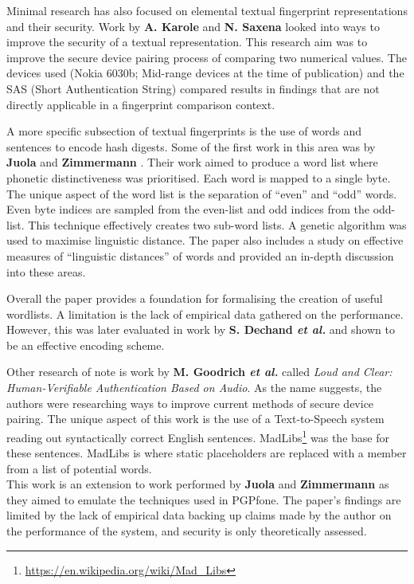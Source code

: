 Minimal research has also focused on elemental textual fingerprint representations and their security. Work by \textbf{A. Karole} and \textbf{N. Saxena}\cite{karole2009improving} looked into ways to improve the security of a textual representation. This research aim was to improve the secure device pairing process of comparing two numerical values. The devices used (Nokia 6030b; Mid-range devices at the time of publication) and the SAS (Short Authentication String) compared results in findings that are not directly applicable in a fingerprint comparison context. 

A more specific subsection of textual fingerprints is the use of words and sentences to encode hash digests. Some of the first work in this area was by \textbf{Juola} and \textbf{Zimmermann} \cite{juola1996whole}. Their work aimed to produce a word list where phonetic distinctiveness was prioritised. Each word is mapped to a single byte. The unique aspect of the word list is the separation of ``even'' and ``odd'' words. Even byte indices are sampled from the even-list and odd indices from the odd-list. This technique effectively creates two sub-word lists.  A genetic algorithm was used to maximise linguistic distance. The paper also includes a study on effective measures of ``linguistic distances'' of words and provided an in-depth discussion into these areas.

Overall the paper provides a foundation for formalising the creation of useful wordlists. A limitation is the lack of empirical data gathered on the performance. However, this was later evaluated in work by \textbf{S. Dechand \textit{et al.}}\cite{dechand2016empirical} and shown to be an effective encoding scheme.

Other research of note is work by \textbf{M. Goodrich \textit{et al.}}\cite{goodrich2006loud} called \textit{Loud and Clear: Human-Verifiable Authentication Based on Audio}. As the name suggests, the authors were researching ways to improve current methods of secure device pairing. The unique aspect of this work is the use of a Text-to-Speech system reading out syntactically correct English sentences. MadLibs\footnote{\url{https://en.wikipedia.org/wiki/Mad\_Libs}} was the base for these sentences. MadLibs is where static placeholders are replaced with a member from a list of potential words.\\
This work is an extension to work performed by \textbf{Juola} and \textbf{Zimmermann}\cite{juola1996whole} as they aimed to emulate the techniques used in PGPfone. The paper's findings are limited by the lack of empirical data backing up claims made by the author on the performance of the system, and security is only theoretically assessed.

